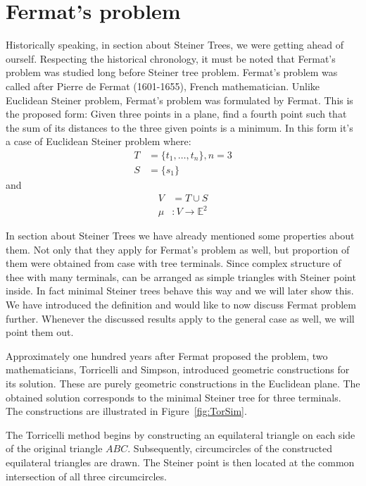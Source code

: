 \documentclass[openany]{book}
\begin{document}
	
	
	\section{Fermat's problem}
	
	Historically speaking, in section about Steiner Trees, we were getting ahead of ourself. Respecting the historical chronology, it must be noted that Fermat's problem was studied long before Steiner tree problem. Fermat's problem was called after Pierre de Fermat (1601-1655), French mathematician. Unlike Euclidean Steiner problem, Fermat's problem was formulated by Fermat. This is the proposed form: Given three points in a plane, find a fourth point such
	that the sum of its distances to the three given points is a minimum.
	In this form it's a case of Euclidean Steiner problem where:
	\[
	\begin{aligned}
		T &= \{t_1, \dots, t_n\}, n=3 \\
		S &= \{s_1\}
	\end{aligned}
	\]
	and
	\[
	\begin{aligned}
		V &= T \cup S \\
		\mu &: V \to \mathbb{E}^2  
	\end{aligned}
	\]
	
	In section about Steiner Trees we have already mentioned some properties about them. Not only that they apply for Fermat's problem as well, but proportion of them were obtained from case with tree terminals. Since complex structure of thee with many terminals, can be arranged as simple triangles with Steiner point inside. In fact minimal Steiner trees behave this way and we will later show this. We have introduced the definition and would like to now discuss Fermat problem further. Whenever the discussed results apply to the general case as well, we will point them out.  
	
	Approximately one hundred years after Fermat proposed the problem, two mathematicians, Torricelli and Simpson, introduced geometric constructions for its solution. These are purely geometric constructions in the Euclidean plane. The obtained solution corresponds to the minimal Steiner tree for three terminals. The constructions are illustrated in Figure~\ref{fig:TorSim}.
	
	The Torricelli method begins by constructing an equilateral triangle on each side of the original triangle $ABC$. Subsequently, circumcircles of the constructed equilateral triangles are drawn. The Steiner point is then located at the common intersection of all three circumcircles.
	
\end{document}
